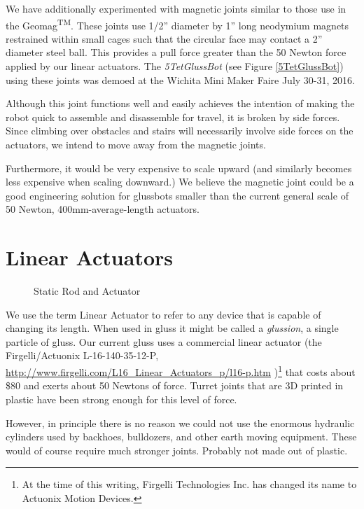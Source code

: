 \documentclass[11pt]{article}
\begin{document}
We have additionally experimented with magnetic joints similar to those use in the Geomag\textsuperscript{TM}.
These joints use 1/2'' diameter by 1'' long neodymium magnets restrained within small cages such that the circular face
may contact a 2'' diameter steel ball.  This provides a pull force greater than the 50 Newton force applied by our linear
actuators. The \emph{5TetGlussBot} (see Figure \ref{5TetGlussBot}) using these
joints was demoed at the Wichita Mini Maker Faire July 30-31, 2016.

Although this joint functions well and easily achieves the intention of making the robot quick to assemble and disassemble for travel,
it is broken by side forces. Since climbing over obstacles and stairs will necessarily involve side forces on the actuators,
we intend to move away from the magnetic joints.

Furthermore, it would be very expensive to scale upward (and similarly becomes less expensive when
scaling downward.) We believe the magnetic joint could be a good engineering solution for glussbots smaller than the current
general scale of 50 Newton, 400mm-average-length actuators.


\section{Linear Actuators}
\label{linearactuators}

\begin{figure}[!ht]
  \centering
    \caption[Static Rod and Actuator]{Static Rod and Actuator}
      \label{rodAndActuator}
\end{figure}

We use the term Linear Actuator to refer to any device that is capable of changing its length. When
used in gluss it might be called a \emph{glussion}, a single particle of gluss. Our current gluss
uses a commercial linear actuator (the Firgelli/Actuonix L-16-140-35-12-P,
\href{http://www.firgelli.com/L16_Linear_Actuators_p/l16-p.htm}{http://www.firgelli.com/L16\_Linear\_Actuators\_p/l16-p.htm}
)\footnote{At the time of this writing, Firgelli Technologies Inc. has changed its name to Actuonix Motion Devices.}
that costs about \$80 and exerts about 50 Newtons of force.
Turret joints that are 3D printed in plastic have been strong enough for this level of force.

However, in principle there is no reason we could not use the enormous hydraulic cylinders
used by backhoes, bulldozers, and other earth moving equipment. These would of course require much
stronger joints. Probably not made out of plastic.
\end{document}
